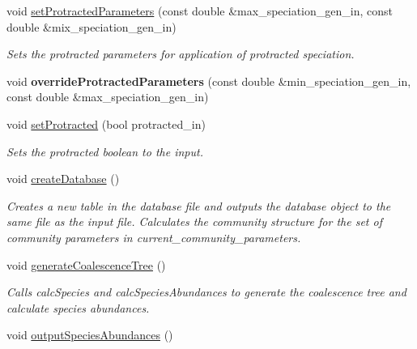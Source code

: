 \begin{DoxyCompactItemize}
void \hyperlink{class_community_a3833e048848d21bc0292c05e86b7d5ce}{set\+Protracted\+Parameters} (const double \&max\+\_\+speciation\+\_\+gen\+\_\+in, const double \&mix\+\_\+speciation\+\_\+gen\+\_\+in)
\begin{DoxyCompactList}\small\item\em Sets the protracted parameters for application of protracted speciation. \end{DoxyCompactList}\item 
void {\bfseries override\+Protracted\+Parameters} (const double \&min\+\_\+speciation\+\_\+gen\+\_\+in, const double \&max\+\_\+speciation\+\_\+gen\+\_\+in)\hypertarget{class_community_a132137f2a27a6fad21ada4c94726480a}{}\label{class_community_a132137f2a27a6fad21ada4c94726480a}

\item 
void \hyperlink{class_community_a649afbf07398a1717ad49cb22bb744ff}{set\+Protracted} (bool protracted\+\_\+in)
\begin{DoxyCompactList}\small\item\em Sets the protracted boolean to the input. \end{DoxyCompactList}\item 
void \hyperlink{class_community_ad6e92dafaf00fd65cc29ca436dc61a2e}{create\+Database} ()
\begin{DoxyCompactList}\small\item\em Creates a new table in the database file and outputs the database object to the same file as the input file. Calculates the community structure for the set of community parameters in current\+\_\+community\+\_\+parameters. \end{DoxyCompactList}\item 
void \hyperlink{class_community_a078a9a1210d6b7e8f6f378891f7e8b86}{generate\+Coalescence\+Tree} ()\hypertarget{class_community_a078a9a1210d6b7e8f6f378891f7e8b86}{}\label{class_community_a078a9a1210d6b7e8f6f378891f7e8b86}

\begin{DoxyCompactList}\small\item\em Calls calc\+Species and calc\+Species\+Abundances to generate the coalescence tree and calculate species abundances. \end{DoxyCompactList}\item 
void \hyperlink{class_community_a8cb8044c6b2e290e7933cbc78d7019be}{output\+Species\+Abundances} ()\hypertarget{class_community_a8cb8044c6b2e290e7933cbc78d7019be}{}\label{class_community_a8cb8044c6b2e290e7933cbc78d7019be}


\end{DoxyCompactItemize}
